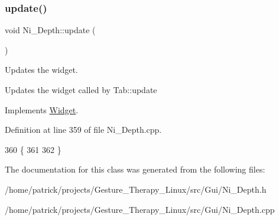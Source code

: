 \subsubsection{\texorpdfstring{update()}{update()}}
{\footnotesize\ttfamily void Ni\+\_\+\+Depth\+::update (\begin{DoxyParamCaption}{ }\end{DoxyParamCaption})\hspace{0.3cm}{\ttfamily [virtual]}}



Updates the widget. 

Updates the widget called by Tab\+::update 

Implements \hyperlink{class_widget_a726dc97add2c6eb82967144207280ace}{Widget}.



Definition at line 359 of file Ni\+\_\+\+Depth.\+cpp.


\begin{DoxyCode}
360 \{
361 
362 \}
\end{DoxyCode}


The documentation for this class was generated from the following files\+:\begin{DoxyCompactItemize}
\item 
/home/patrick/projects/\+Gesture\+\_\+\+Therapy\+\_\+\+Linux/src/\+Gui/Ni\+\_\+\+Depth.\+h\item 
/home/patrick/projects/\+Gesture\+\_\+\+Therapy\+\_\+\+Linux/src/\+Gui/Ni\+\_\+\+Depth.\+cpp\end{DoxyCompactItemize}
